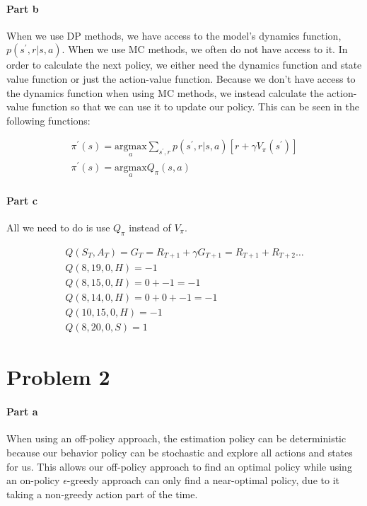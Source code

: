 \documentclass[12pt]{article}
\begin{document}
\paragraph{Part b} When we use DP methods, we have access to the model's dynamics function, $p(s^\prime, r|s, a)$. When we use MC methods, we often do not have access to it. In order to calculate the next policy, we either need the dynamics function and state value function or just the action-value function. Because we don't have access to the dynamics function when using MC methods, we instead calculate the action-value function so that we can use it to update our policy. This can be seen in the following functions:

\begin{gather*}
  \pi^\prime (s) = \underset{a}{\text{argmax}} \sum_{s^\prime, r} p(s^\prime, r | s, a)[r + \gamma V_\pi(s^\prime)] \\
  \pi^\prime (s) = \underset{a}{\text{argmax}} Q_\pi(s, a)
\end{gather*}


\paragraph{Part c} All we need to do is use $Q_\pi$ instead of $V_\pi$.

\begin{gather*}
  Q(S_T, A_T) = G_T = R_{T+1} + \gamma G_{T+1} = R_{T+1} + R_{T+2} \dots \\
  Q(8, 19, 0, H) = -1 \\
  Q(8, 15, 0, H) = 0 + -1 = -1 \\
  Q(8, 14, 0, H) = 0 + 0 + -1 = -1 \\
  Q(10, 15, 0, H) = -1 \\
  Q(8, 20, 0, S) = 1
\end{gather*}

\section{Problem 2}

\paragraph{Part a} When using an off-policy approach, the estimation policy can be deterministic because our behavior policy can be stochastic and explore all actions and states for us. This allows our off-policy approach to find an optimal policy while using an on-policy $\epsilon$-greedy approach can only find a near-optimal policy, due to it taking a non-greedy action part of the time.
\end{document}
